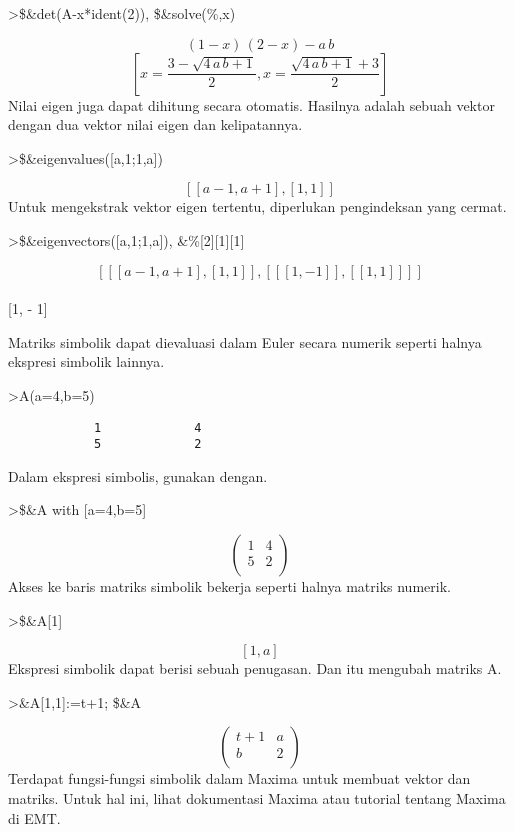 \documentclass[
]{book}
\begin{document}
\textgreater\$\&det(A-x*ident(2)), \$\&solve(\%,x)

\[\left(1-x\right)\,\left(2-x\right)-a\,b\]\[\left[ x=\frac{3-\sqrt{4\,a\,b+1}}{2} , x=\frac{\sqrt{4\,a\,b+1}+3
 }{2} \right] \]Nilai eigen juga dapat dihitung secara otomatis. Hasilnya adalah sebuah vektor dengan dua vektor nilai eigen dan kelipatannya.

\textgreater\$\&eigenvalues({[}a,1;1,a{]})

\[\left[ \left[ a-1 , a+1 \right]  , \left[ 1 , 1 \right]  \right] \]Untuk mengekstrak vektor eigen tertentu, diperlukan pengindeksan yang cermat.

\textgreater\$\&eigenvectors({[}a,1;1,a{]}), \&\%{[}2{]}{[}1{]}{[}1{]}

\[\left[ \left[ \left[ a-1 , a+1 \right]  , \left[ 1 , 1 \right] 
  \right]  , \left[ \left[ \left[ 1 , -1 \right]  \right]  , \left[ 
 \left[ 1 , 1 \right]  \right]  \right]  \right] \]\\
{[}1, - 1{]}

Matriks simbolik dapat dievaluasi dalam Euler secara numerik seperti halnya ekspresi simbolik lainnya.

\textgreater A(a=4,b=5)

\begin{verbatim}
            1             4 
            5             2 
\end{verbatim}

Dalam ekspresi simbolis, gunakan dengan.

\textgreater\$\&A with {[}a=4,b=5{]}

\[\begin{pmatrix}1 & 4 \\ 5 & 2 \\ \end{pmatrix}\]Akses ke baris matriks simbolik bekerja seperti halnya matriks numerik.

\textgreater\$\&A{[}1{]}

\[\left[ 1 , a \right] \]Ekspresi simbolik dapat berisi sebuah penugasan. Dan itu mengubah matriks A.

\textgreater\&A{[}1,1{]}:=t+1; \$\&A

\[\begin{pmatrix}t+1 & a \\ b & 2 \\ \end{pmatrix}\]Terdapat fungsi-fungsi simbolik dalam Maxima untuk membuat vektor dan matriks. Untuk hal ini, lihat dokumentasi Maxima atau tutorial tentang Maxima di EMT.
\end{document}
